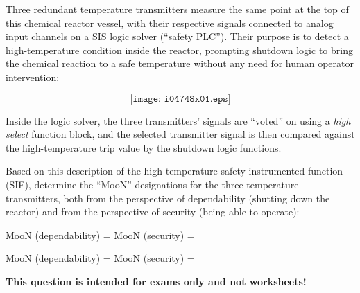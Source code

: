 

Three redundant temperature transmitters measure the same point at the top of this chemical reactor vessel, with their respective signals connected to analog input channels on a SIS logic solver (``safety PLC'').  Their purpose is to detect a high-temperature condition inside the reactor, prompting shutdown logic to bring the chemical reaction to a safe temperature without any need for human operator intervention:

$$\texttt{[image: i04748x01.eps]}$$

Inside the logic solver, the three transmitters' signals are ``voted'' on using a {\it high select} function block, and the selected transmitter signal is then compared against the high-temperature trip value by the shutdown logic functions.  

Based on this description of the high-temperature safety instrumented function (SIF), determine the ``MooN'' designations for the three temperature transmitters, both from the perspective of dependability (shutting down the reactor) and from the perspective of security (being able to operate):

\vskip 10pt

MooN (dependability) = \underbar{\hskip 50pt}  \hskip 70pt MooN (security) = \underbar{\hskip 50pt}







MooN (dependability) =   \hskip 70pt MooN (security) = 







{\bf This question is intended for exams only and not worksheets!}




